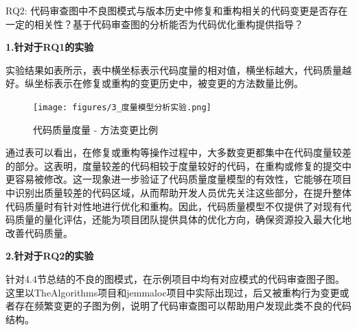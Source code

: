 RQ2: 代码审查图中不良图模式与版本历史中修复和重构相关的代码变更是否存在一定的相关性？基于代码审查图的分析能否为代码优化重构提供指导？


\textbf{1.针对于RQ1的实验}


实验结果如表所示，表中横坐标表示代码度量的相对值，横坐标越大，代码质量越好。纵坐标表示在修复或重构的变更历史中，被变更的方法数量比例。

\begin{figure}[h]
\centering
\texttt{[image: figures/3\_度量模型分析实验.png]}
\caption{代码质量度量 - 方法变更比例}
\label{1_度量模型分析实验}
\end{figure}


通过表可以看出，在修复或重构等操作过程中，大多数变更都集中在代码度量较差的部分。这表明，度量较差的代码相较于度量较好的代码，在重构或修复的提交中更容易被修改。这一现象进一步验证了代码质量度量模型的有效性，它能够在项目中识别出质量较差的代码区域，从而帮助开发人员优先关注这些部分，在提升整体代码质量时有针对性地进行优化和重构。因此，代码质量模型不仅提供了对现有代码质量的量化评估，还能为项目团队提供具体的优化方向，确保资源投入最大化地改善代码质量。

\textbf{2.针对于RQ2的实验}




针对4.4节总结的不良的图模式，在示例项目中均有对应模式的代码审查图子图。这里以TheAlgorithms项目和jemmaloc项目中实际出现过，后又被重构行为变更或者存在频繁变更的子图为例，说明了代码审查图可以帮助用户发现此类不良的代码结构。

